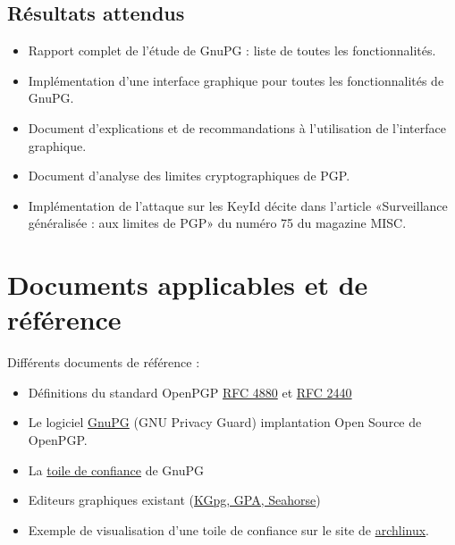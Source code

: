 \documentclass{../res/univ-projet}
\begin{document}
\subsection{Résultats attendus}
\begin{itemize}
 \item Rapport complet de l'étude de GnuPG : liste de toutes les fonctionnalités.
 \item Implémentation d'une interface graphique pour toutes les fonctionnalités de GnuPG.
 \item Document d'explications et de recommandations à l'utilisation de l'interface graphique.
 \item Document d'analyse des limites cryptographiques de PGP.
 \item Implémentation de l'attaque sur les KeyId décite dans l'article «Surveillance généralisée : aux limites de PGP» du numéro 75 du magazine MISC.
\end{itemize}



\section{Documents applicables et de référence}
Différents documents de référence :
\begin{itemize}
\item Définitions du standard OpenPGP \href{file:../../ressources/openPGP/rfc4880-en.pdf}{RFC 4880}
  et \href{file:../../ressources/openPGP/rfc2440-fr.pdf}{RFC 2440}
\item Le logiciel \href{https://www.gnupg.org/}{GnuPG} (GNU Privacy Guard) implantation Open Source
  de OpenPGP.
\item La \href{https://www.gnupg.org/gph/fr/manual.html#AEN541}{toile de confiance} de GnuPG
\item Editeurs graphiques existant 
  (\href{http://www.gnupg.org/related_software/frontends.en.html}{KGpg, GPA, Seahorse})
\item Exemple de visualisation d'une toile de confiance sur le site de 
  \href{https://www.archlinux.org/master-keys/#visualization}{archlinux}.
\end{itemize}

\end{document}
